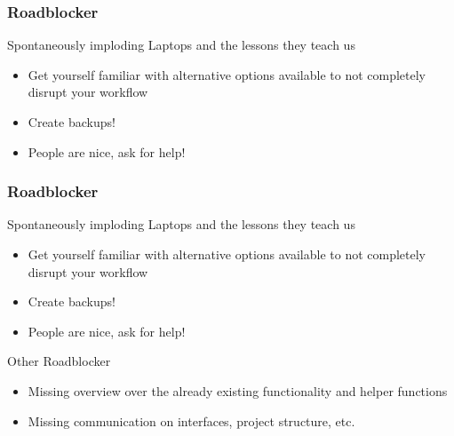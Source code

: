 \begin{frame}
	\frametitle{Roadblocker}
	\Large
	Spontaneously imploding Laptops and the lessons they teach us
	\large
	\begin{itemize}
		\item<1-> Get yourself familiar with alternative options available to not completely disrupt your workflow
		\item<2-> Create backups!
		\item<3-> People are nice, ask for help!
	\end{itemize}
	
\end{frame}

\begin{frame}
	\frametitle{Roadblocker}
	\Large
	Spontaneously imploding Laptops and the lessons they teach us
	\large
	\begin{itemize}
		\item Get yourself familiar with alternative options available to not completely disrupt your workflow
		\item Create backups!
		\item People are nice, ask for help!
	\end{itemize}

	\Large
	Other Roadblocker
	\large
	\begin{itemize}
		\item<1->  Missing overview over the already existing functionality and helper functions
		\item<2->  Missing communication on interfaces, project structure, etc.
	\end{itemize}
	
\end{frame}




